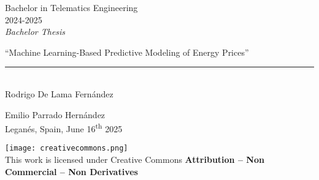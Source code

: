\documentclass[12pt]{report} %
\begin{document}



\begin{titlepage}
	\begin{sffamily}
	\color{azulUC3M}
	\begin{center}
		\begin{figure}[H] %
		\end{figure}
		\vspace{2.5cm}
		\begin{Large}
			Bachelor in Telematics Engineering\\			
			 2024-2025\\ %
			\vspace{2cm}		
			\textsl{Bachelor Thesis}
			\bigskip
			
		\end{Large}
		 	{\Huge ``Machine Learning-Based Predictive Modeling of Energy Prices''}\\
		 	\vspace*{0.5cm}
	 		\rule{10.5cm}{0.1mm}\\
			\vspace*{0.9cm}
			{\LARGE Rodrigo De Lama Fernández}\\ 
			\vspace*{1cm}
		\begin{Large}
			Emilio Parrado Hernández\\
			Leganés, Spain, June 16\textsuperscript{th} 2025\\
		\end{Large}
	\end{center}
	\vfill
	\color{black}
	\texttt{[image: creativecommons.png]}\\ %
    This work is licensed under Creative Commons \textbf{Attribution – Non Commercial – Non Derivatives}
	\end{sffamily}
\end{titlepage}


\newpage %
\thispagestyle{empty}
\mbox{}
\end{document}
